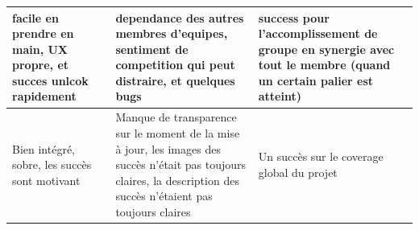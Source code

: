 \begin{center}
\begin{longtable}{|p{5.1cm}|p{5.1cm}|p{5.1cm}|}
		\hline
		facile en prendre en main, UX propre, et succes unlcok rapidement & dependance des autres membres d'equipes, sentiment de competition qui peut distraire, et quelques bugs  & success pour l'accomplissement de groupe en synergie avec tout le membre (quand un certain palier est atteint) \\
		\hline
		Bien intégré, sobre, les succès sont motivant & Manque de transparence sur le moment de la mise à jour, les images des succès n'était pas toujours claires, la description des succès n'étaient pas toujours claires & Un succès sur le coverage global du projet \\
		\hline
	\end{longtable}
	\label{table:open-questions-answers}
\end{center}